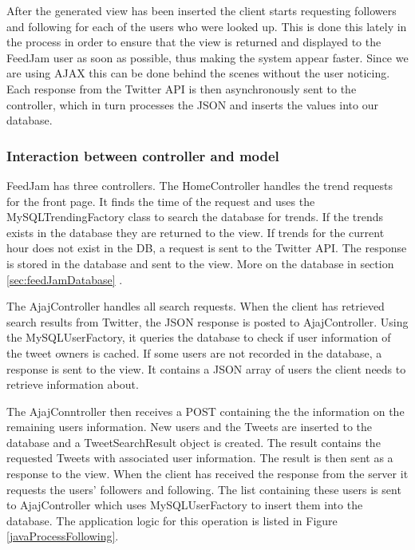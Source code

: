 After the generated view has been inserted the client starts requesting followers and following for each of the users who were looked up. This is done this lately in the process in order to ensure that the view is returned and displayed to the FeedJam user as soon as possible, thus making the system appear faster. Since we are using AJAX this can be done behind the scenes without the user noticing. Each response from the Twitter API is then asynchronously sent to the controller, which in turn processes the JSON and inserts the values into our database.

\subsubsection{Interaction between controller and model} %
\label{interactionControllerModel}
FeedJam has three controllers. The HomeController handles the trend requests for the front page. It finds the time of the request and uses the MySQLTrendingFactory class to search the database for trends. If the trends exists in the database they are returned to the view. If trends for the current hour does not exist in the DB, a request is sent to the  Twitter API. The response is stored in the database and sent to the view. More on the database in section \ref{sec:feedJamDatabase} .

The AjajController handles all search requests. When the client has retrieved search results from Twitter, the JSON response is posted to AjajController. Using the MySQLUserFactory, it queries the database to check if user information of the tweet owners is cached. If some users are not recorded in the database, a response is sent to the view. It contains a JSON array of users the client needs to retrieve information about. 

The AjajConntroller then receives a POST containing the the information on the remaining users information. New users and the Tweets are inserted to the database and a TweetSearchResult object is created. The result contains the requested Tweets with associated user information. The result is then sent as a response to the view. When the client has received the response from the server it requests the users' followers and following. The list containing these users is sent to AjajController which uses MySQLUserFactory to insert them into the database. The application logic for this operation is listed in Figure \ref{javaProcessFollowing}.

